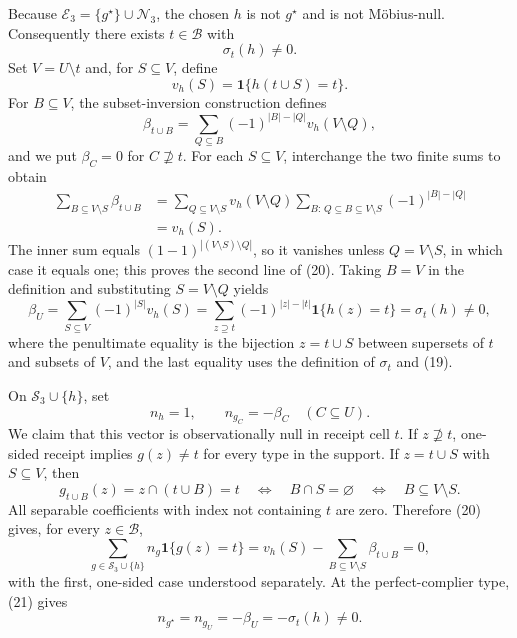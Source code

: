 Because \(\mathcal E_3=\{g^\star\}\cup\mathcal N_3\), the chosen \(h\) is not \(g^\star\) and is not Möbius-null.  Consequently there exists \(t\in\mathcal B\) with
\[
\sigma_t(h)\ne0. \tag{19}
\]
Set \(V=U\setminus t\) and, for \(S\subseteq V\), define
\[
v_h(S)=\mathbf 1\{h(t\cup S)=t\}.
\]
For \(B\subseteq V\), the subset-inversion construction defines
\[
\beta_{t\cup B}
=\sum_{Q\subseteq B}(-1)^{|B|-|Q|}v_h(V\setminus Q),
\]
and we put \(\beta_C=0\) for \(C\not\supseteq t\).  For each \(S\subseteq V\), interchange the two finite sums to obtain
\[
\begin{aligned}
\sum_{B\subseteq V\setminus S}\beta_{t\cup B}
&=\sum_{Q\subseteq V\setminus S}v_h(V\setminus Q)
  \sum_{B:\,Q\subseteq B\subseteq V\setminus S}(-1)^{|B|-|Q|}\\
&=v_h(S). \tag{20}
\end{aligned}
\]
The inner sum equals \((1-1)^{|(V\setminus S)\setminus Q|}\), so it vanishes unless \(Q=V\setminus S\), in which case it equals one; this proves the second line of (20).  Taking \(B=V\) in the definition and substituting \(S=V\setminus Q\) yields
\[
\beta_U
=\sum_{S\subseteq V}(-1)^{|S|}v_h(S)
=\sum_{z\supseteq t}(-1)^{|z|-|t|}\mathbf 1\{h(z)=t\}
=\sigma_t(h)\ne0, \tag{21}
\]
where the penultimate equality is the bijection \(z=t\cup S\) between supersets of \(t\) and subsets of \(V\), and the last equality uses the definition of \(\sigma_t\) and (19).

On \(\mathcal S_3\cup\{h\}\), set
\[
n_h=1,
\qquad
n_{g_C}=-\beta_C \quad(C\subseteq U).
\]
We claim that this vector is observationally null in receipt cell \(t\).  If \(z\not\supseteq t\), one-sided receipt implies \(g(z)\ne t\) for every type in the support.  If \(z=t\cup S\) with \(S\subseteq V\), then
\[
g_{t\cup B}(z)=z\cap(t\cup B)=t
\quad\Longleftrightarrow\quad
B\cap S=\varnothing
\quad\Longleftrightarrow\quad
B\subseteq V\setminus S.
\]
All separable coefficients with index not containing \(t\) are zero.  Therefore (20) gives, for every \(z\in\mathcal B\),
\[
\sum_{g\in\mathcal S_3\cup\{h\}}n_g\mathbf 1\{g(z)=t\}
=v_h(S)-\sum_{B\subseteq V\setminus S}\beta_{t\cup B}
=0, \tag{22}
\]
with the first, one-sided case understood separately.  At the perfect-complier type, (21) gives
\[
n_{g^\star}=n_{g_U}=-\beta_U=-\sigma_t(h)\ne0. \tag{23}
\]

